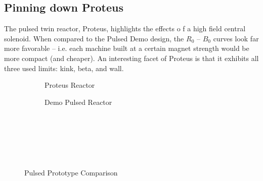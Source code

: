 \begin{table}[h!]
\begin{subtable}[t]{0.5\textwidth}
\begin{tabular}{ c|c }
\end{tabular}
\end{subtable}
\hfill
\hfill
\end{table}

\newpage 

\subsection{Pinning down Proteus}

The pulsed twin reactor, Proteus, highlights the effects o f a high field central solenoid. When compared to the Pulsed Demo design, the $R_0$ -- $B_0$ curves look far more favorable -- i.e. each machine built at a certain magnet strength would be more compact (and cheaper). An interesting facet of Proteus is that it exhibits all three used limits: kink, beta, and wall.

\begin{figure*}[h!]
    \centering
    \hfill 
    \begin{subfigure}[t]{0.45\textwidth}
        \centering
    \begin{adjustbox}{width=\textwidth}
      \Large
      
    \end{adjustbox}
        \caption{Proteus Reactor}
    \end{subfigure}
    \hfill
    \begin{subfigure}[t]{0.45\textwidth}
        \centering
    \begin{adjustbox}{width=\textwidth}
      \Large
      
    \end{adjustbox}
        \caption{Demo Pulsed Reactor}
    \end{subfigure}
    \hfill \hfill ~\\ ~\\ ~\\
    \caption{Pulsed Prototype Comparison} ~\\
\end{figure*}

